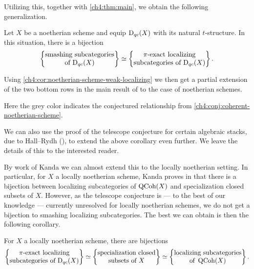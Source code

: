Utilizing this, together with \cref{ch4:thm:main}, we obtain the following generalization. 

\begin{corollary}
    Let $X$ be a noetherian scheme and equip $\mathrm{D}_{qc}(X)$ with its natural $t$-structure. In this situation, there is a bijection
    \[\left\{ \begin{matrix} \text{smashing subcategories}\\ \text{of }\mathrm{D}_{qc}(X) \end{matrix} \right\} \simeq \left\{ \begin{matrix} \pi\text{-exact localizing}\\ \text{subcategories of }\mathrm{D}_{qc}(X) \end{matrix} \right\}.\]
\end{corollary}

Using \cref{ch4:cor:noetherian-scheme-weak-localizing} we then get a partial extension of the two bottom rows in the main result of \cite{takahashi_2009} to the case of noetherian schemes.  

\begin{center}
\end{center}

Here the grey color indicates the conjectured relationship from \cref{ch4:conj:coherent-noetherian-scheme}. 

We can also use the proof of the telescope conjecture for certain algebraic stacks, due to Hall--Rydh (\cite{hall-rydh_2017}), to extend the above corollary even further. We leave the details of this to the interested reader. 

By work of Kanda we can almost extend this to the locally noetherian setting. In particular, for $X$ a locally noetherian scheme, Kanda proves in \cite[1.4]{kanda_2015} that there is a bijection between localizing subcategories of $\operatorname{QCoh}(X)$ and specialization closed subsets of $X$. However, as the telescope conjecture is --- to the best of our knowledge --- currently unresolved for locally noetherian schemes, we do not get a bijection to smashing localizing subcategories. The best we can obtain is then the following corollary. 

\begin{corollary}
    For $X$ a locally noetherian scheme, there are bijections
    \[\left\{ \begin{matrix} \pi\text{-exact localizing}\\ \text{subcategories of }\mathrm{D}_{qc}(X) \end{matrix} \right\}\simeq \left\{ \begin{matrix} \text{specialization closed}\\ \text{subsets of }X \end{matrix} \right\} \simeq \left\{ \begin{matrix} \text{localizing subcategories}\\ \text{of }\operatorname{QCoh}(X) \end{matrix} \right\}.\]
\end{corollary}

